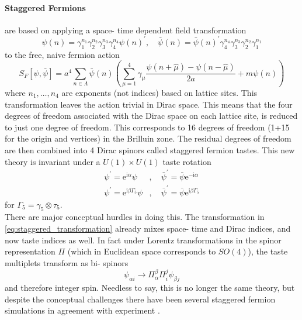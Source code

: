 \documentclass[a4paper,10pt]{article}
\begin{document}
\paragraph{Staggered Fermions} are based on applying a space- time dependent field transformation 
\begin{equation}\label{eq:staggered_transformation}
\psi(n)=\gamma_{1}^{n_{1}} \gamma_{2}^{n_{2}} \gamma_{3}^{n_{3}} \gamma_{4}^{n_{4}} \psi(n)^{\prime}, \quad \bar{\psi}(n)=\bar{\psi}(n)^{\prime} \gamma_{4}^{n_{4}} \gamma_{3}^{n_{3}} \gamma_{2}^{n_{2}} \gamma_{1}^{n_{1}}
\end{equation}
to the free, naive fermion action
\begin{equation}
S_{F}[\psi, \bar{\psi}]=a^{4} \sum_{n \in \Lambda} \bar{\psi}(n)\left(\sum_{\mu=1}^{4} \gamma_{\mu} \frac{\psi(n+\hat{\mu})-\psi(n-\hat{\mu})}{2 a}+m \psi(n)\right)
\end{equation}
where $n_1,\ldots,n_4$ are exponents (not indices) based on lattice sites. This transformation leaves the action trivial in Dirac space. This means that the four degrees of freedom associated with the Dirac space on each lattice site, is reduced to just one degree of freedom. This corresponds to 16 degrees of freedom (1+15 for the origin and vertices) in the Brilluin zone. The residual degrees of freedom are then combined into 4 Dirac spinors called staggered fermion tastes. This new theory is invariant under a $U(1)\times U(1)$ taste rotation 
\begin{equation}
\begin{aligned}
\psi^{\prime}=\mathrm{e}^{\mathrm{i} \alpha} \psi &, \quad \bar{\psi}^{\prime}=\bar{\psi} \mathrm{e}^{-\mathrm{i} \alpha} \\
\psi^{\prime}=\mathrm{e}^{\mathrm{i} \beta \Gamma_{5}} \psi &, \quad \bar{\psi}^{\prime}=\bar{\psi} \mathrm{e}^{\mathrm{i} \beta \Gamma_{5}}
\end{aligned}
\end{equation}
for $\Gamma_{5}=\gamma_{5} \otimes \tau_{5}$.\\There are major conceptual hurdles in doing this. The transformation in \eqref{eq:staggered_transformation} already mixes space- time and Dirac indices, and now taste indices as well. In fact under Lorentz transformations in the spinor representation $\Pi$ (which in Euclidean space corresponds to $SO(4)$), the taste multiplets transform as bi- spinors
\begin{equation}
\psi_{\alpha i} \rightarrow \Pi_{\alpha}^{\beta} \Pi_{i}^{j} \psi_{\beta j}
\end{equation}
and therefore integer spin. Needless to say, this is no longer the same theory, but despite the conceptual challenges there have been several staggered fermion simulations in agreement with experiment \cite{PhysRevLett.92.022001}\cite{Follana:2006rc}.
\end{document}
